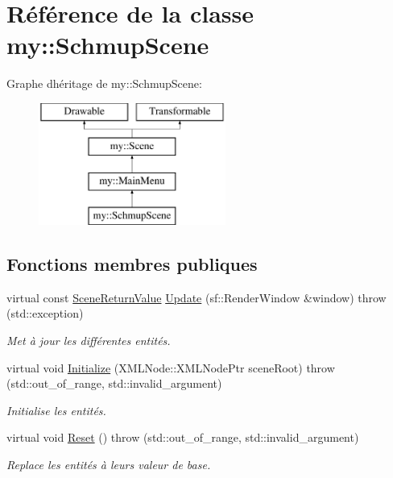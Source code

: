 \hypertarget{classmy_1_1SchmupScene}{}\section{Référence de la classe my\+:\+:Schmup\+Scene}
\label{classmy_1_1SchmupScene}
Graphe d\textquotesingle{}héritage de my\+:\+:Schmup\+Scene\+:\begin{figure}[H]
\begin{center}
\leavevmode
\includegraphics[height=4.000000cm]{classmy_1_1SchmupScene}
\end{center}
\end{figure}
\subsection*{Fonctions membres publiques}
\begin{DoxyCompactItemize}
\item 
virtual const \hyperlink{structmy_1_1SceneReturnValue}{Scene\+Return\+Value} \hyperlink{classmy_1_1SchmupScene_ad07d5b2302f0a4250150d51fdcfa1c0b}{Update} (sf\+::\+Render\+Window \&window)  throw (std\+::exception)
\begin{DoxyCompactList}\small\item\em Met à jour les différentes entités. \end{DoxyCompactList}\item 
virtual void \hyperlink{classmy_1_1SchmupScene_ad1febbc7aaf1fc8b2eb4d02cdbf3f57a}{Initialize} (X\+M\+L\+Node\+::\+X\+M\+L\+Node\+Ptr scene\+Root)  throw (std\+::out\+\_\+of\+\_\+range, std\+::invalid\+\_\+argument)
\begin{DoxyCompactList}\small\item\em Initialise les entités. \end{DoxyCompactList}\item 
\mbox{\label{classmy_1_1SchmupScene_afe90a166e047830a86a0e7b331085d20}} 
virtual void \hyperlink{classmy_1_1SchmupScene_afe90a166e047830a86a0e7b331085d20}{Reset} ()  throw (std\+::out\+\_\+of\+\_\+range, std\+::invalid\+\_\+argument)
\begin{DoxyCompactList}\small\item\em Replace les entités à leurs valeur de base. \end{DoxyCompactList}\end{DoxyCompactItemize}
